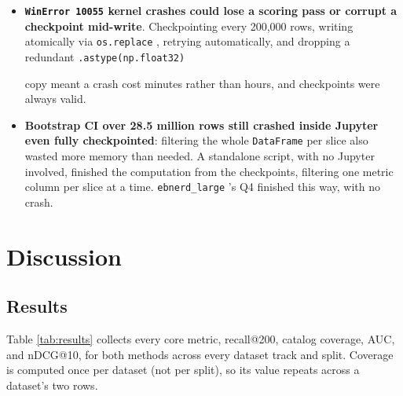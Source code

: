 \documentclass[11pt]{article}
\newcommand{\code}[1]{%
    \colorbox{gray!40}{\texttt{#1}}%
}
\begin{document}
\begin{sloppypar}
\begin{itemize}
\item \textbf{\code{WinError 10055} kernel crashes could lose a scoring pass or corrupt a
checkpoint mid-write}. Checkpointing every 200,000 rows, writing atomically via
\code{os.replace}, retrying automatically, and dropping a redundant \code{.astype(np.float32)}
copy meant a crash cost minutes rather than hours, and checkpoints were always valid.

\item \textbf{Bootstrap CI over 28.5 million rows still crashed inside Jupyter even fully
checkpointed}: filtering the whole \code{DataFrame} per slice also wasted more memory than
needed. A standalone script, with no Jupyter involved, finished the computation from the
checkpoints, filtering one metric column per slice at a time. \code{ebnerd\_large}'s Q4 finished
this way, with no crash.
\end{itemize}
\end{sloppypar}

\section{Discussion}
\label{sec:discussion}

\subsection{Results}
\label{sec:results}

Table \ref{tab:results} collects every core metric, recall@200, catalog coverage, AUC, and
nDCG@10, for both methods across every dataset track and split. Coverage is computed once per
dataset (not per split), so its value repeats across a dataset's two rows.
\end{document}
